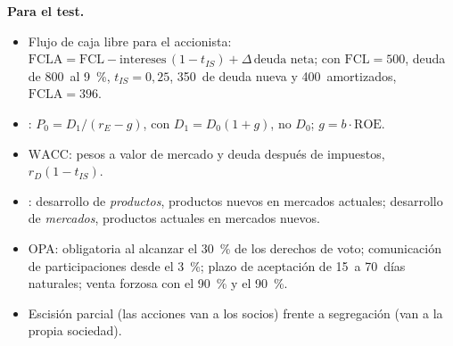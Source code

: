 \documentclass[11pt]{article}
\begin{document}
\begin{anotaciones}
\textbf{Para el test.}
\begin{itemize}
\item Flujo de caja libre para el accionista: $\mathrm{FCLA}=\mathrm{FCL}-\text{intereses}\,(1-t_{IS})+\Delta\,\text{deuda neta}$; con $\mathrm{FCL}=500$, deuda de 800~al 9~\%, $t_{IS}=0{,}25$, 350~de deuda nueva y 400~amortizados, $\mathrm{FCLA}=396$.
\item {}: $P_0=D_1/(r_E-g)$, con $D_1=D_0(1+g)$, no $D_0$; $g=b\cdot\mathrm{ROE}$.
\item $\mathrm{WACC}$: pesos a valor de mercado y deuda después de impuestos, $r_D(1-t_{IS})$.
\item {}: desarrollo de \emph{productos}, productos nuevos en mercados actuales; desarrollo de \emph{mercados}, productos actuales en mercados nuevos.
\item OPA: obligatoria al alcanzar el 30~\% de los derechos de voto; comunicación de participaciones desde el 3~\%; plazo de aceptación de 15~a 70~días naturales; venta forzosa con el 90~\% y el 90~\%.
\item Escisión parcial (las acciones van a los socios) frente a segregación (van a la propia sociedad).
\end{itemize}
\end{anotaciones}

\bibliografia
\end{document}
